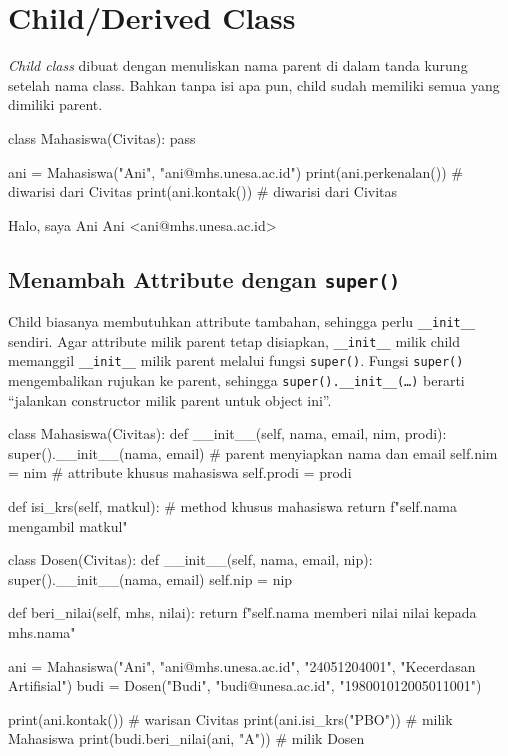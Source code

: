 \section{Child/Derived Class}

\emph{Child class} dibuat dengan menuliskan nama parent di dalam tanda kurung setelah nama class. Bahkan tanpa isi apa pun, child sudah memiliki semua yang dimiliki parent.

\begin{kode}
class Mahasiswa(Civitas):
    pass

ani = Mahasiswa("Ani", "ani@mhs.unesa.ac.id")
print(ani.perkenalan())        # diwarisi dari Civitas
print(ani.kontak())            # diwarisi dari Civitas
\end{kode}

\begin{keluaran}
Halo, saya Ani
Ani <ani@mhs.unesa.ac.id>
\end{keluaran}

\subsection{Menambah Attribute dengan \texttt{super()}}

Child biasanya membutuhkan attribute tambahan, sehingga perlu \texttt{\_\_init\_\_} sendiri. Agar attribute milik parent tetap disiapkan, \texttt{\_\_init\_\_} milik child memanggil \texttt{\_\_init\_\_} milik parent melalui fungsi \texttt{super()}. Fungsi \texttt{super()} mengembalikan rujukan ke parent, sehingga \texttt{super().\_\_init\_\_(\ldots)} berarti ``jalankan constructor milik parent untuk object ini''.

\begin{kode}
class Mahasiswa(Civitas):
    def __init__(self, nama, email, nim, prodi):
        super().__init__(nama, email)    # parent menyiapkan nama dan email
        self.nim = nim                   # attribute khusus mahasiswa
        self.prodi = prodi

    def isi_krs(self, matkul):           # method khusus mahasiswa
        return f"{self.nama} mengambil {matkul}"

class Dosen(Civitas):
    def __init__(self, nama, email, nip):
        super().__init__(nama, email)
        self.nip = nip

    def beri_nilai(self, mhs, nilai):
        return f"{self.nama} memberi nilai {nilai} kepada {mhs.nama}"

ani = Mahasiswa("Ani", "ani@mhs.unesa.ac.id", "24051204001", "Kecerdasan Artifisial")
budi = Dosen("Budi", "budi@unesa.ac.id", "198001012005011001")

print(ani.kontak())                  # warisan Civitas
print(ani.isi_krs("PBO"))            # milik Mahasiswa
print(budi.beri_nilai(ani, "A"))     # milik Dosen
\end{kode}

